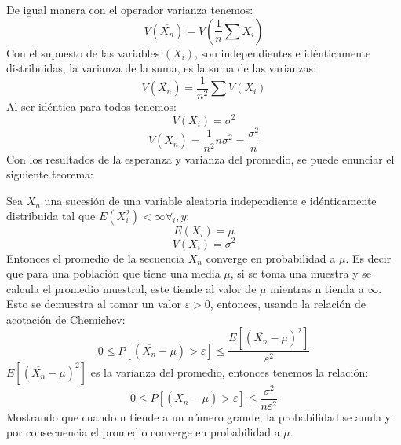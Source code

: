 \documentclass{rbf}
\begin{document}
De igual manera con el operador varianza tenemos:
\begin{equation}
    V(\overline{X_n})=V(\frac{1}{n} \sum X_i)
\end{equation}
Con el supuesto de las variables $(X_i )$, son independientes e idénticamente distribuidas, la varianza de la suma, es la suma de las varianzas:
\begin{equation}
    V(\overline{X_n})=\frac{1}{n^2} \sum V(X_i)
\end{equation}
Al ser idéntica para todos tenemos:
\begin{equation}
    V({X_i})=\sigma^2
\end{equation}
\begin{equation}
    V(\overline{X_n})=\frac{1}{n^2} n\sigma^2 =\frac{\sigma^2}{n}
\end{equation}
Con los resultados de la esperanza y varianza del promedio, se puede enunciar el siguiente teorema: 

Sea $X_n$ una sucesión de una variable aleatoria independiente e idénticamente distribuida tal que $E(X_i^2 )<\infty  \forall_i ,y:$
\begin{equation}
    E({X_i})=\mu
\end{equation}
\begin{equation}
    V({X_i})=\sigma^2
\end{equation}
Entonces el promedio de la secuencia $X_n$ converge en probabilidad a $\mu$. Es decir que para una población que tiene una media $\mu$, si se toma una muestra y se calcula el promedio muestral, este tiende al valor de $\mu$ mientras n tienda a $\infty$. 
Esto se demuestra al tomar un valor $\varepsilon> 0$, entonces, usando la relación de acotación de Chemichev:
\begin{equation}
    0\leq P[(\overline{X_n}-\mu)>\varepsilon] \leq \frac{E[(\overline{X_n}-\mu)^2]}{\varepsilon^2}
\end{equation}
$E[(\overline{X_n}-\mu)^2]$ es la varianza del promedio, entonces tenemos la relación:
\begin{equation}
    0\leq P[(\overline{X_n}-\mu)>\varepsilon] \leq \frac{\sigma^2}{n\varepsilon^2}
\end{equation}
Mostrando que cuando n tiende a un número grande, la probabilidad se anula y por consecuencia el promedio converge en probabilidad a $\mu$.
\end{document}
